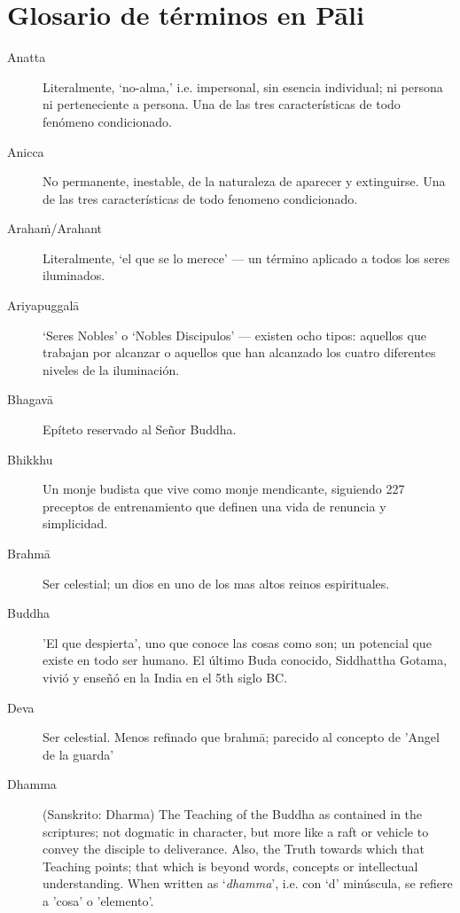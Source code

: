 \chapter{Glosario de términos en Pāli }

\enlargethispage{2\baselineskip}

\begin{description}

\item[Anatta] Literalmente, `no-alma,' i.e. impersonal, sin esencia individual;
 ni persona ni perteneciente a persona. Una de las tres características de todo fenómeno condicionado.

\item[Anicca] No permanente, inestable, de la naturaleza de aparecer y extinguirse. Una de las tres características de todo fenomeno condicionado.

\item[Arahaṁ/Arahant] Literalmente, ‘el que se lo merece’ --- un término aplicado a todos los seres iluminados. 

\item[Ariyapuggalā] ‘Seres Nobles’ o ‘Nobles Discipulos’ --- existen ocho tipos: aquellos que trabajan por alcanzar o aquellos que han alcanzado los cuatro diferentes niveles de la iluminación.

\item[Bhagavā] Epíteto reservado al Señor Buddha.

\item[Bhikkhu] Un monje budista que vive como monje mendicante, siguiendo 227 preceptos de entrenamiento que definen una vida de renuncia y simplicidad.

\item[Brahmā] Ser celestial; un dios en uno de los mas altos reinos espirituales.

\item[Buddha] 'El que despierta', uno que conoce las cosas como son; un potencial que existe en todo ser humano. El último Buda conocido,
  Siddhattha Gotama, vivió y enseñó en la India en el 5th siglo BC.

\item[Deva] Ser celestial. Menos refinado que brahmā; parecido al concepto de 'Angel de la guarda'

\item[Dhamma] (Sanskrito: Dharma) The Teaching of the Buddha as contained
  in the scriptures; not dogmatic in character, but more like a raft or
  vehicle to convey the disciple to deliverance. Also, the Truth towards
  which that Teaching points; that which is beyond words, concepts or
  intellectual understanding. When written as ‘\emph{dhamma}’, i.e.
  con `d' minúscula, se refiere a 'cosa’ o 'elemento'.


\end{description}
